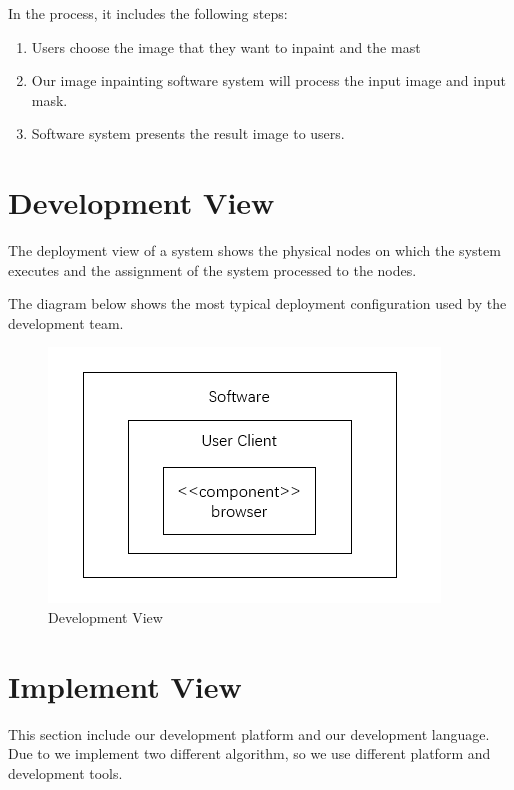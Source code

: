 \documentclass[12pt]{article}
\begin{document}
In the process, it includes the following steps:
\begin{enumerate}
	\item Users choose the image that they want to inpaint and the mast
	\item Our image inpainting software system will process the input image and input mask.
	\item Software system presents the result image to users. 
\end{enumerate}

\section{Development View}
\qquad The deployment view of a system shows the physical nodes on which the system executes and the assignment of the system processed to the nodes. 

The diagram below shows the most typical deployment configuration used by the development team.
\begin{figure}[H]
	\centering
	\includegraphics[width=0.8\linewidth]{develop.jpg}
	\caption{Development View}
\end{figure}


\section{Implement View}
\qquad This section include our development platform and our development language. Due to we implement two different algorithm, so we use different platform and development tools.
\end{document}

